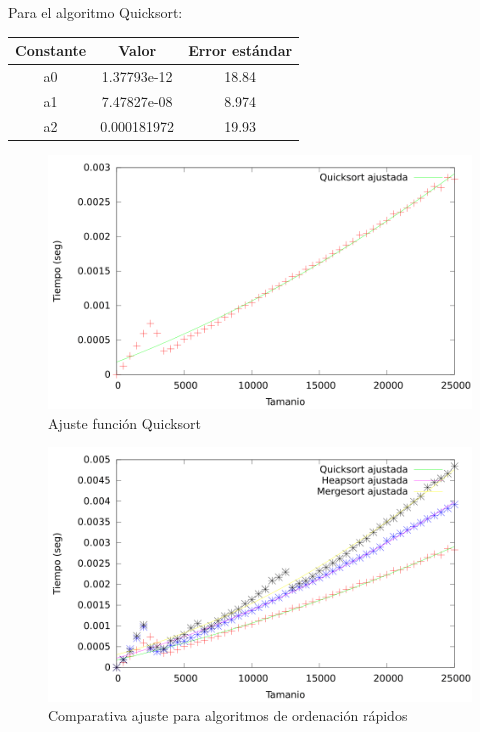 \documentclass{article}
\begin{document}
	Para el algoritmo Quicksort:

	\begin{longtable}{|c|c|c|}
		\hline
		Constante		& Valor			& Error estándar	\\ \hline
		a0              & 1.37793e-12	& 18.84 \\ \hline
		a1              & 7.47827e-08	& 8.974 \\ \hline
		a2              & 0.000181972	& 19.93 \\ \hline
	\end{longtable}
	
	

	\begin{figure}[h]
		\centering
		\includegraphics[totalheight=8cm]{img/Quicksort_ajustada}
		\caption{Ajuste función Quicksort}
		\label{fig:Quicksort_ajustada}
	\end{figure}
	
	
	\begin{figure}[h]
		\centering
		\includegraphics[totalheight=8cm]{img/AlgOrdenacionRapidos_ajustados}
		\caption{Comparativa ajuste para algoritmos de ordenación rápidos}
		\label{fig:AlgOrdenacionRapidos_ajustados}
	\end{figure}
\end{document}
